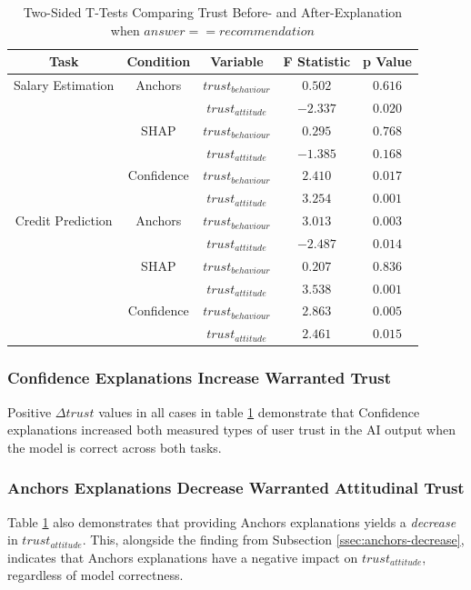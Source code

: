 \begin{table}[htbp]
    \caption{Two-Sided T-Tests Comparing Trust Before- and After-Explanation when $answer == recommendation$}
    \begin{center}
    \begin{tabular}{ccccc}
        \toprule
        Task & Condition & Variable & F Statistic & p Value \\ 
        \midrule
        Salary Estimation & Anchors & $trust_{behaviour}$ & $0.502$ & $0.616$ \\
        & & $trust_{attitude}$ & $\mathbf{-2.337}$ & $\mathbf{0.020}$ \\
        & SHAP & $trust_{behaviour}$ & $0.295$ & $0.768$ \\
        & & $trust_{attitude}$ & $-1.385$ & $0.168$ \\
        & Confidence & $trust_{behaviour}$ & $\mathbf{2.410}$ & $\mathbf{0.017}$ \\
        & & $trust_{attitude}$ & $\mathbf{3.254}$ & $\mathbf{0.001}$ \\
        \midrule
        Credit Prediction & Anchors & $trust_{behaviour}$ & $\mathbf{3.013}$ & $\mathbf{0.003}$ \\
        & & $trust_{attitude}$ & $\mathbf{-2.487}$ & $\mathbf{0.014}$ \\
        & SHAP & $trust_{behaviour}$ & $0.207$ & $0.836$ \\
        & & $trust_{attitude}$ & $\mathbf{3.538}$ & $\mathbf{0.001}$ \\
        & Confidence & $trust_{behaviour}$ & $\mathbf{2.863}$ & $\mathbf{0.005}$ \\
        & & $trust_{attitude}$ & $\mathbf{2.461}$ & $\mathbf{0.015}$ \\
        \bottomrule
    \end{tabular}
    \label{tab:delta-trust-t-positives}
    \end{center}
\end{table}

\subsubsection{Confidence Explanations Increase Warranted Trust}
Positive $\Delta trust$ values in all cases in table \ref{tab:delta-trust-t-positives} demonstrate that Confidence explanations increased both measured types of user trust in the AI output when the model is correct across both tasks.

\subsubsection{Anchors Explanations Decrease Warranted Attitudinal Trust}
Table \ref{tab:delta-trust-t-positives} also demonstrates that providing Anchors explanations yields a \emph{decrease} in $trust_{attitude}$. This, alongside the finding from Subsection \ref{ssec:anchors-decrease}, indicates that Anchors explanations have a negative impact on $trust_{attitude}$, regardless of model correctness.

